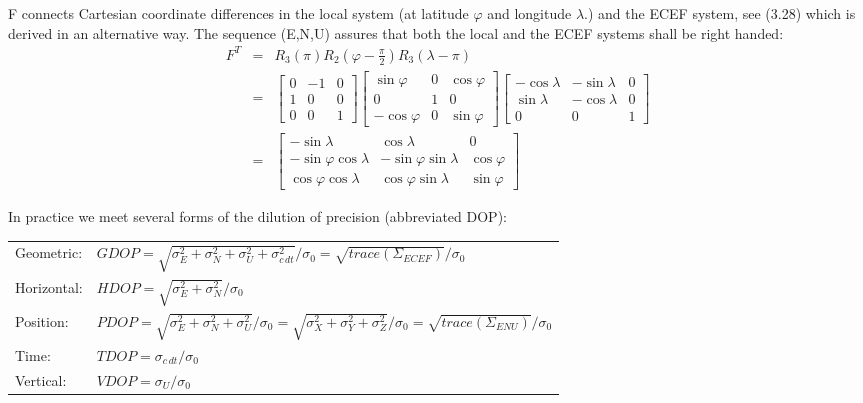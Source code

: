 		F connects Cartesian coordinate differences in the local system (at latitude $\varphi$ and longitude $\lambda$.) and the ECEF system, see (3.28) which is derived in an alternative way. The sequence (E,N,U) assures that both the local and the ECEF systems shall be right handed:
		\begin{equation}\label{eq:9.29}
		\begin{array}{rcl}
			F^T &=& R_3(\pi)R_2(\varphi-\frac{\pi}{2})R_3(\lambda-\pi) \\
				&=&\begin{bmatrix}
						0 & -1 & 0 \\
						1 &  0 & 0 \\
						0 &  0 & 1
					\end{bmatrix}
					\begin{bmatrix}
					\sin \varphi & 0 & \cos \varphi \\
					0 & 1 & 0 \\
					-\cos \varphi& 0 & \sin \varphi
					\end{bmatrix}
					\begin{bmatrix}
					-\cos \lambda & -\sin \lambda & 0 \\
					\sin \lambda & -\cos \lambda & 0 \\
					0 & 			0 & 1 
					\end{bmatrix} \\
				 &=&\begin{bmatrix}
					-\sin \lambda & \cos \lambda & 0 \\
					-\sin \varphi \cos \lambda & -\sin \varphi \sin \lambda & \cos \varphi \\
					\cos \varphi \cos \lambda & \cos \varphi \sin \lambda & \sin \varphi 
					\end{bmatrix}
		\end{array}	
		\end{equation}
			
		In practice we meet several forms of the dilution of precision (abbreviated DOP):
		\begin{table}
			\begin{tabularx}{\textwidth}{lX}
				Geometric: & $GDOP=\sqrt{\sigma^2_E+\sigma^2_N+\sigma^2_U+\sigma^2_{c\,dt}}/\sigma_0=\sqrt{trace(\Sigma_{ECEF})}/\sigma_0$ \\
				Horizontal:&$HDOP=\sqrt{\sigma^2_E+\sigma^2_N}/\sigma_0$ \\
				Position:  & $PDOP=\sqrt{\sigma^2_E+\sigma^2_N+\sigma^2_U}/\sigma_0=\sqrt{\sigma^2_X+\sigma^2_Y+\sigma^2_Z}/\sigma_0=\sqrt{trace(\Sigma_{ENU})}/\sigma_0 $ \\
				Time:	   &$TDOP=\sigma_{c\,dt}/\sigma_0$ \\
				Vertical:  &$VDOP=\sigma_U/\sigma_0$ 
			\end{tabularx}
		\end{table}
		
